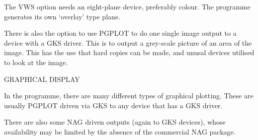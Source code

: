 {{  The VWS option needs an eight-plane device, preferably colour.
  The programme generates its own `overlay' type plane.
                                                                               
  There is also the option to use PGPLOT to do one single image
  output to a device with a GKS driver. This is to output a
  grey-scale picture of an area of the image. This has the use
  that hard copies can be made, and unusal devices utilised to
  look at the image.
                                                                               
  GRAPHICAL DISPLAY
                                                                               
  In the programme, there are many different types of graphical
  plotting. These are usually PGPLOT driven via GKS to any
  device that has a GKS driver.
                                                                               
  There are also some NAG driven outputs (again to GKS devices),
  whose availability may be limited by the absence of the
  commercial NAG package.
                                                                               
}}
